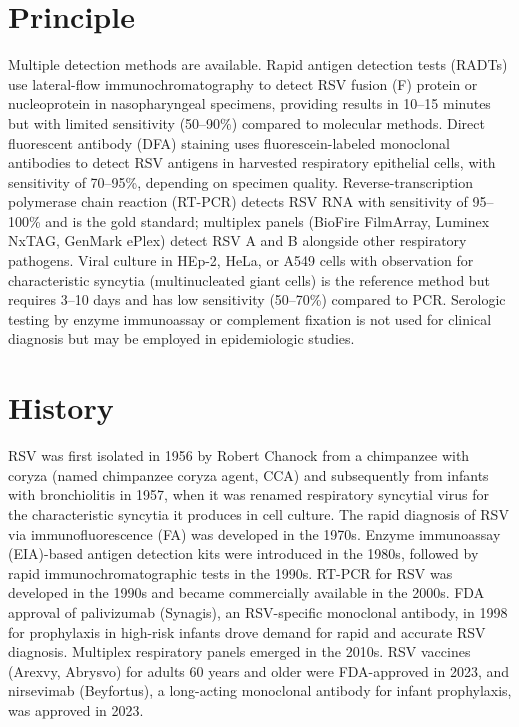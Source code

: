 \section*{Principle}
Multiple detection methods are available. Rapid antigen detection tests (RADTs) use lateral-flow immunochromatography to detect RSV fusion (F) protein or nucleoprotein in nasopharyngeal specimens, providing results in 10--15 minutes but with limited sensitivity (50--90\%) compared to molecular methods. Direct fluorescent antibody (DFA) staining uses fluorescein-labeled monoclonal antibodies to detect RSV antigens in harvested respiratory epithelial cells, with sensitivity of 70--95\%, depending on specimen quality. Reverse-transcription polymerase chain reaction (RT-PCR) detects RSV RNA with sensitivity of 95--100\% and is the gold standard; multiplex panels (BioFire FilmArray, Luminex NxTAG, GenMark ePlex) detect RSV A and B alongside other respiratory pathogens. Viral culture in HEp-2, HeLa, or A549 cells with observation for characteristic syncytia (multinucleated giant cells) is the reference method but requires 3--10 days and has low sensitivity (50--70\%) compared to PCR. Serologic testing by enzyme immunoassay or complement fixation is not used for clinical diagnosis but may be employed in epidemiologic studies.

\section*{History}
RSV was first isolated in 1956 by Robert Chanock from a chimpanzee with coryza (named chimpanzee coryza agent, CCA) and subsequently from infants with bronchiolitis in 1957, when it was renamed respiratory syncytial virus for the characteristic syncytia it produces in cell culture. The rapid diagnosis of RSV via immunofluorescence (FA) was developed in the 1970s. Enzyme immunoassay (EIA)-based antigen detection kits were introduced in the 1980s, followed by rapid immunochromatographic tests in the 1990s. RT-PCR for RSV was developed in the 1990s and became commercially available in the 2000s. FDA approval of palivizumab (Synagis), an RSV-specific monoclonal antibody, in 1998 for prophylaxis in high-risk infants drove demand for rapid and accurate RSV diagnosis. Multiplex respiratory panels emerged in the 2010s. RSV vaccines (Arexvy, Abrysvo) for adults 60 years and older were FDA-approved in 2023, and nirsevimab (Beyfortus), a long-acting monoclonal antibody for infant prophylaxis, was approved in 2023.

